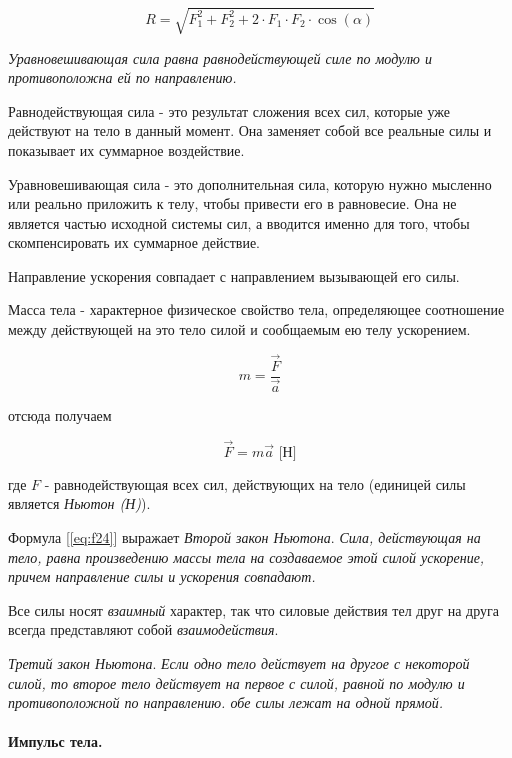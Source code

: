 \documentclass[a4paper,12pt]{article}
\begin{document}
		\begin{equation}
			\label{eq:f22}
			R = \sqrt{F_1^2+F_2^2+2 \cdot F_1 \cdot F_2 \cdot \cos{(\alpha)}}
		\end{equation}


		\textit{Уравновешивающая сила равна равнодействующей силе по модулю и
		противоположна ей по направлению.}

		Равнодействующая сила - это результат сложения всех сил, которые уже 
		действуют на тело в данный момент. Она заменяет собой все реальные силы 
		и показывает их суммарное воздействие.

		Уравновешивающая сила - это дополнительная сила, которую нужно мысленно 
		или реально приложить к телу, чтобы привести его в равновесие. Она не 
		является частью исходной системы сил, а вводится именно для того, чтобы 
		скомпенсировать их суммарное действие.
		
		Направление ускорения совпадает с направлением вызывающей его силы.

		Масса тела - характерное физическое свойство тела, определяющее соотношение
		между действующей на это тело силой и сообщаемым ею телу ускорением.

		\begin{equation}
			m = \frac{\vec{F}}{\vec{a}}
		\end{equation}
		
		отсюда получаем

		\begin{equation}
			\label{eq:f24}
			\vec{F} = m\vec{a} \text{ [Н]}
		\end{equation}

		где $F$ - равнодействующая всех сил, действующих на тело (единицей силы
		является \textit{Ньютон (Н)}).

		Формула [\ref{eq:f24}] выражает \textit{Второй закон Ньютона}. \textit{Сила,
		действующая на тело, равна произведению массы тела на создаваемое этой 
		силой ускорение, причем направление силы и ускорения совпадают.}

		Все силы носят \textit{взаимный} характер, так что силовые действия тел
		друг на друга всегда представляют собой \textit{взаимодействия}.

		\textit{Третий закон Ньютона}. \textit{Если одно тело действует на другое
		с некоторой силой, то второе тело действует на первое с силой, равной
		по модулю и противоположной по направлению. обе силы лежат на одной прямой.}


		\paragraph{Импульс тела.} \
		
\end{document}
